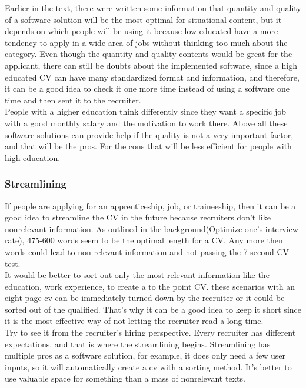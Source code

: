 Earlier in the text, there were written some information 
that quantity and quality of a software solution will be the most optimal for situational content,
but it depends on which people will be using it because low educated have a more tendency to apply
in a wide area of jobs without thinking too much about the category. 
Even though the quantity and quality contents would be great for the applicant, 
there can still be doubts about the implemented software, since a high educated CV can have many standardized format and information,
and therefore, it can be a good idea to check it one more time instead of using a software one time and then sent it to the recruiter. \\

People with a higher education think differently since they want a specific job
with a good monthly salary and the motivation to work there. 
Above all these software solutions can provide help if the quality is not a very important factor,
and that will be the pros. For the cons that will be less efficient for people with high education.


\subsubsection{Streamlining}
If people are applying for an apprenticeship, job, or traineeship, 
then it can be a good idea to streamline the CV in the future because recruiters don't like nonrelevant information.
As outlined in the background(Optimize one's interview rate), 475-600 words seem to be the optimal length for a CV.
Any more then words could lead to non-relevant information and not passing the 7 second CV test. \\

It would be better to sort out only the most relevant information like the education, work experience, to create a to the point CV. 
these scenarios with an eight-page cv can be immediately turned down by the recruiter or it could be sorted out of the qualified.
That's why it can be a good idea to keep it short since it is the most effective way of not letting the recruiter read a long time. \\

Try to see it from the recruiter's hiring perspective. Every recruiter has different expectations, 
and that is where the streamlining begins. Streamlining has multiple pros as a software solution,
for example, it does only need a few user inputs, so it will automatically create a cv with a sorting method. 
It's better to use valuable space for something than a mass of nonrelevant texts. \\

